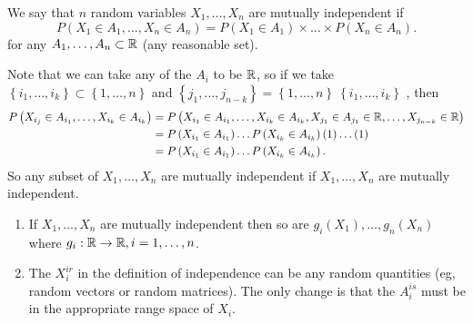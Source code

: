 
\begin{definition}
	We say that $n$ random variables $X_{1} , \ldots , X_{n}$ are mutually independent if 
	\[
		P\left( X_1 \in A_1, \ldots, X_{n} \in  A_{n} \right) = P\left( X_1 \in  A_1 \right) \times \ldots\times P\left( X_{n}\in A_{n} \right) 
	.\] 
	for any $A_{1} , \ldots , A_{n} \subset \mathbb{R}$ (any reasonable set).

	Note that we can take any of the $A_{i}$ to be $\mathbb{R}$, so if we take $\left\{ i_{1} , \ldots , i_{k} \right\} \subset \left\{ 1, \ldots , n \right\} $ and $\left\{ j_{1} , \ldots , j_{n-k} \right\}  = \left\{ 1, \ldots, n \right\}  \ \left\{ i_{1} , \ldots , i_{k} \right\} $ , then
	\begin{align*}
		P\left( X_{i_{j}} \in A_{i_{1}}, \ldots, X_{i_{k}} \in  A_{i_{k}} \right) &= P\left( X_{i_{1}} \in  A_{i_1}, \ldots, X_{i_{k}} \in A_{i_{k}}, X_{j_1} \in  A_{j_1} \in  \mathbb{R}, \ldots, X_{j_{n-k}} \in \mathbb{R} \right)  \\
											  &= P\left( X_{i_1} \in A_{i_1} \right) \ldots P\left( X_{i_{k}} \in  A_{i_{k}} \right) \left( 1 \right) \ldots \left( 1 \right)  \\
											  &= P\left( X_{i_1} \in A_{i_1} \right) \ldots P\left( X_{i_{k}} \in  A_{i_{k}} \right) 
	.\end{align*}
	So any subset of $X_{1} , \ldots , X_{n}$ are mutually independent if $X_{1} , \ldots , X_{n}$ are mutually independent. 
\end{definition}

\begin{remark}
	 \begin{enumerate}
		 \item If $X_{1} , \ldots , X_{n}$ are mutually independent then so are $g_{i}\left( X_1	 \right) , \ldots , g_{n}\left( X_{n} \right) $ where $g_{i} : \mathbb{R} \to \mathbb{R}, i = 1, \ldots, n$.
		 \item The $X^{ir}_{i}$ in the definition of independence can be any random quantities (eg, random vectors or random matrices). The only change is that the $A^{is}_{i}$ must be in the appropriate range space of $X_{i}$. 
	\end{enumerate}
\end{remark}

